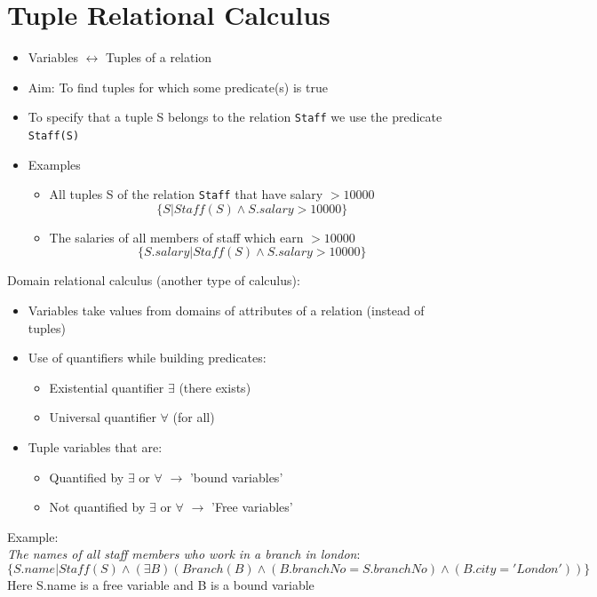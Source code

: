 \documentclass{article}[18pt]
\begin{document}
\section{Tuple Relational Calculus}
\begin{itemize}
	\item Variables $\leftrightarrow$ Tuples of a relation
	\item Aim: To find tuples for which some predicate(s) is true
	\item To specify that a tuple S belongs to the relation \texttt{Staff} we use the predicate \texttt{Staff(S)}
	\item Examples
	\begin{itemize}
		\item All tuples S of the relation \texttt{Staff} that have salary $>10000$
		$$\{S|Staff(S)\land S.salary>10000\}$$
		\item The salaries of all members of staff which earn $>10000$
		$$\{S.salary|Staff(S)\land S.salary>10000\}$$
	\end{itemize}
\end{itemize}
Domain relational calculus (another type of calculus):
\begin{itemize}
	\item Variables take values from domains of attributes of a relation (instead of tuples)
\end{itemize}
\begin{itemize}
	\item Use of quantifiers while building predicates:
	\begin{itemize}
		\item Existential quantifier $\exists$ (there exists)
		\item Universal quantifier $\forall$ (for all)
	\end{itemize}
	\item Tuple variables that are:
	\begin{itemize}
		\item Quantified by $\exists$ or $\forall$ $\rightarrow$ 'bound variables'
		\item Not quantified by $\exists$ or $\forall$ $\rightarrow$ 'Free variables'
	\end{itemize}
\end{itemize}
Example:\\
\textit{The names of all staff members who work in a branch in london}:
$$\{S.name|Staff(S)\land (\exists B)(Branch(B)\land (B.branchNo=S.branchNo)\land (B.city='London'))\}$$
Here S.name is a free variable and B is a bound variable
\end{document}

